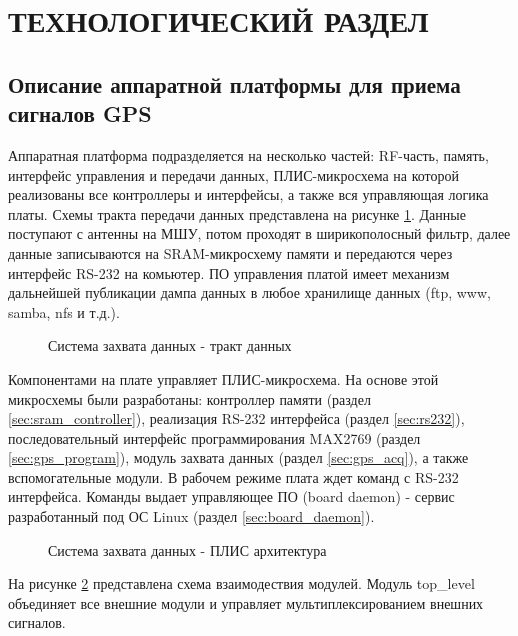 \section{ТЕХНОЛОГИЧЕСКИЙ РАЗДЕЛ}

\subsection{Описание аппаратной платформы для приема сигналов GPS}
Аппаратная платформа подразделяется на несколько частей: RF-часть, память, интерфейс управления и передачи данных, ПЛИС-микросхема
на которой реализованы все контроллеры и интерфейсы, а также вся управляющая логика платы. Схемы тракта передачи данных
представлена на рисунке \ref{pic:board_scheme}. Данные поступают с антенны на МШУ, потом проходят в ширикополосный фильтр, далее
данные записываются на SRAM-микросхему памяти и передаются через интерфейс RS-232 на комьютер. ПО управления платой имеет механизм
дальнейшей публикации дампа данных в любое хранилище данных (ftp, www, samba, nfs и т.д.). 

\begin{figure}[H]
\caption{Система захвата данных - тракт данных}
\label{pic:board_scheme}
\end{figure}

Компонентами на плате управляет ПЛИС-микросхема. На основе этой микросхемы были разработаны: контроллер памяти (раздел \ref{sec:sram_controller}), реализация RS-232
интерфейса (раздел \ref{sec:rs232}), последовательный интерфейс программирования MAX2769 (раздел \ref{sec:gps_program}), модуль захвата данных
(раздел \ref{sec:gps_acq}), а также вспомогательные модули. В рабочем режиме плата ждет команд с RS-232 интерфейса. Команды выдает
управляющее ПО (board daemon) - сервис разработанный под ОС Linux (раздел \ref{sec:board_daemon}). 

\begin{figure}[H]
\begin{center}
\end{center}
\caption{Система захвата данных - ПЛИС архитектура}
\label{pic:fpga_scheme}
\end{figure}

На рисунке \ref{pic:fpga_scheme} представлена схема взаимодествия модулей. Модуль top\_level объединяет все внешние модули и 
управляет мультиплексированием внешних сигналов.

